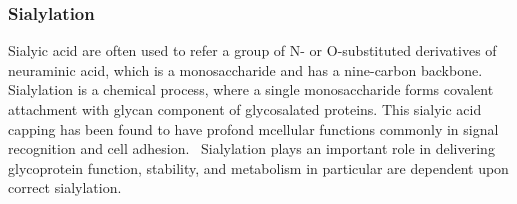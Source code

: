 \subsubsection {Sialylation}
Sialyic acid are often used to refer a group of N- or O-substituted derivatives of neuraminic acid, which is a monosaccharide and has a nine-carbon backbone.~\cite{Vocadlo_2009} Sialylation is a chemical process, where a single monosaccharide forms covalent attachment with glycan component of glycosalated proteins. This sialyic acid capping has been found to have profond mcellular functions commonly in signal recognition and cell adhesion.~\cite{Bhide_2016} Sialylation plays an important role in delivering glycoprotein function, stability, and metabolism in particular are dependent upon correct sialylation.